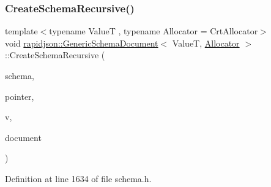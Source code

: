 \subsubsection{\texorpdfstring{CreateSchemaRecursive()}{CreateSchemaRecursive()}}
{\footnotesize\ttfamily template$<$typename ValueT , typename Allocator  = Crt\+Allocator$>$ \\
void \mbox{\hyperlink{classrapidjson_1_1_generic_schema_document}{rapidjson\+::\+Generic\+Schema\+Document}}$<$ ValueT, \mbox{\hyperlink{classrapidjson_1_1_allocator}{Allocator}} $>$\+::Create\+Schema\+Recursive (\begin{DoxyParamCaption}\item[{const \mbox{\hyperlink{classrapidjson_1_1_generic_schema_document_aaf4e7f371de938025f7ed4be3b83266e}{Schema\+Type}} $\ast$$\ast$}]{schema,  }\item[{const \mbox{\hyperlink{classrapidjson_1_1_generic_schema_document_a61540c0f8aa542760ae03257a0e6dab7}{Pointer\+Type}} \&}]{pointer,  }\item[{const \mbox{\hyperlink{classrapidjson_1_1_generic_schema_document_a87eb1db271e7f57442802a5f4f6178f3}{Value\+Type}} \&}]{v,  }\item[{const \mbox{\hyperlink{classrapidjson_1_1_generic_schema_document_a87eb1db271e7f57442802a5f4f6178f3}{Value\+Type}} \&}]{document }\end{DoxyParamCaption})\hspace{0.3cm}{\ttfamily [private]}}



Definition at line 1634 of file schema.\+h.


